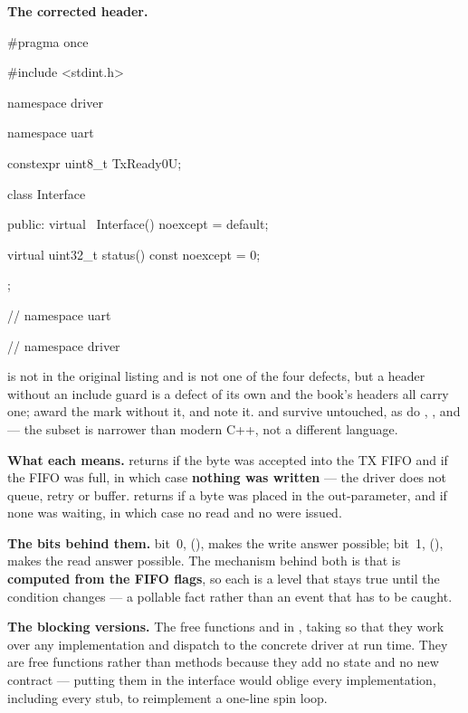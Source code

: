 \textbf{The corrected header.}

\begin{cppcode}
#pragma once

#include <stdint.h>

namespace driver
{
namespace uart
{
constexpr uint8_t TxReady{0U};

class Interface
{
public:
    virtual ~Interface() noexcept = default;

    virtual uint32_t status() const noexcept = 0;
};
} // namespace uart
} // namespace driver
\end{cppcode}

 is not in the original listing and is not one of the four defects, but a header
without an include guard is a defect of its own and the book's headers all carry one; award the mark
without it, and note it.  and  survive untouched, as do ,
,  and  --- the subset is narrower than modern C++, not a
different language.

\textbf{What each  means.}  returns  if the byte was accepted
into the TX FIFO and  if the FIFO was full, in which case \textbf{nothing was written}
--- the driver does not queue, retry or buffer.  returns  if a byte was
placed in the out-parameter, and  if none was waiting, in which case no 
read and no  were issued. 

\textbf{The bits behind them.}  bit~0,  (), makes the
write answer possible; bit~1,  (), makes the read answer
possible. The  mechanism behind both is that  is \textbf{computed from the
FIFO flags}, so each is a level that stays true until the condition changes --- a pollable fact
rather than an event that has to be caught.

\textbf{The blocking versions.} The free functions  and  in
, taking  so that they work over any implementation
and dispatch to the concrete driver at run time. They are free functions rather than methods because
they add no state and no new contract --- putting them in the interface would oblige every
implementation, including every stub, to reimplement a one-line spin loop.

